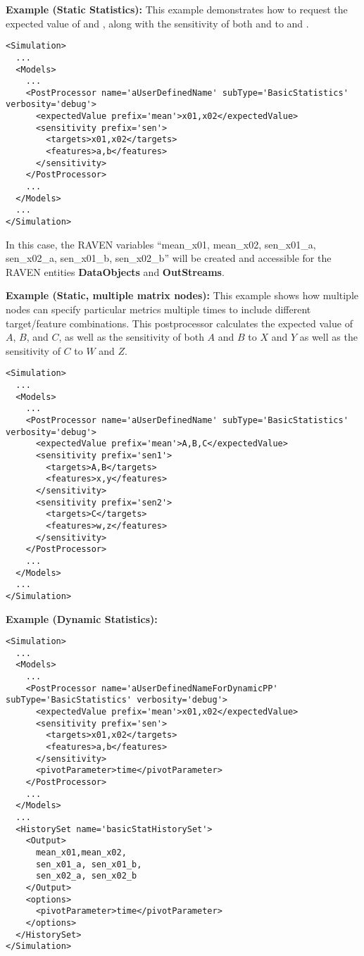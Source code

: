 \textbf{Example (Static Statistics):}  This example demonstrates how to request the expected value of
 and , along with the sensitivity of both  and  to
 and .
\begin{lstlisting}[style=XML,morekeywords={name,subType,debug}]
<Simulation>
  ...
  <Models>
    ...
    <PostProcessor name='aUserDefinedName' subType='BasicStatistics' verbosity='debug'>
      <expectedValue prefix='mean'>x01,x02</expectedValue>
      <sensitivity prefix='sen'>
        <targets>x01,x02</targets>
        <features>a,b</features>
      </sensitivity>
    </PostProcessor>
    ...
  </Models>
  ...
</Simulation>
\end{lstlisting}

In this case, the RAVEN variables ``mean\_x01, mean\_x02, sen\_x01\_a, sen\_x02\_a, sen\_x01\_b, sen\_x02\_b''
will be created and accessible for the RAVEN entities \textbf{DataObjects} and \textbf{OutStreams}.

\textbf{Example (Static, multiple matrix nodes):} This example shows how multiple nodes can specify
particular metrics multiple times to include different target/feature combinations.  This postprocessor
calculates the expected value of $A$, $B$, and $C$, as well as the sensitivity of both $A$ and $B$ to $X$ and
$Y$ as well as the sensitivity of $C$ to $W$ and $Z$.
\begin{lstlisting}[style=XML,morekeywords={name,subType,debug}]
<Simulation>
  ...
  <Models>
    ...
    <PostProcessor name='aUserDefinedName' subType='BasicStatistics' verbosity='debug'>
      <expectedValue prefix='mean'>A,B,C</expectedValue>
      <sensitivity prefix='sen1'>
        <targets>A,B</targets>
        <features>x,y</features>
      </sensitivity>
      <sensitivity prefix='sen2'>
        <targets>C</targets>
        <features>w,z</features>
      </sensitivity>
    </PostProcessor>
    ...
  </Models>
  ...
</Simulation>
\end{lstlisting}
\textbf{Example (Dynamic Statistics):}
\begin{lstlisting}[style=XML,morekeywords={name,subType,debug}]
<Simulation>
  ...
  <Models>
    ...
    <PostProcessor name='aUserDefinedNameForDynamicPP' subType='BasicStatistics' verbosity='debug'>
      <expectedValue prefix='mean'>x01,x02</expectedValue>
      <sensitivity prefix='sen'>
        <targets>x01,x02</targets>
        <features>a,b</features>
      </sensitivity>
      <pivotParameter>time</pivotParameter>
    </PostProcessor>
    ...
  </Models>
  ...
  <HistorySet name='basicStatHistorySet'>
    <Output>
      mean_x01,mean_x02,
      sen_x01_a, sen_x01_b,
      sen_x02_a, sen_x02_b
    </Output>
    <options>
      <pivotParameter>time</pivotParameter>
    </options>
  </HistorySet>
</Simulation>
\end{lstlisting}

